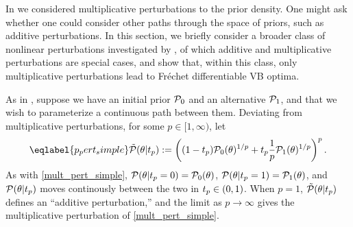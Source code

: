 In  we considered
multiplicative perturbations to the prior density.  One might ask whether one
could consider other paths through the space of priors, such as additive
perturbations.  In this section, we briefly consider a broader class of
nonlinear perturbations investigated by \citet{gustafson:1996:local}, of which
additive and multiplicative perturbations are special cases, and show that,
within this class, only multiplicative perturbations lead to Fr{\'e}chet
differentiable VB optima.

As in , suppose we have an initial prior $\mathcal{P}_{0}$
and an alternative $\mathcal{P}_{1}$, and that we wish to parameterize a continuous path
between them.  Deviating from multiplicative perturbations, for some $p \in [1,
\infty)$, let
%
\begin{align}\eqlabel{p_pert_simple}
%
\ptil(\theta \vert \tp) :=
    \left((1 - \tp)\pbase(\theta)^{1/p} +
    \tp \frac{1}{p}\palt(\theta)^{1/p} \right)^{p}.
%
\end{align}
%
As with \eqref{mult_pert_simple}, $\mathcal{P}(\theta \vert t_{p} = 0) = \mathcal{P}_{0}(\theta)$,
$\mathcal{P}(\theta \vert t_{p} = 1) = \mathcal{P}_{1}(\theta)$, and $\mathcal{P}(\theta \vert t_{p})$ moves
continously between the two in $t_{p} \in (0, 1)$.  When $p = 1$,
$\tilde{\mathcal{P}}(\theta \vert t_{p})$ defines an ``additive perturbation,'' and
the limit as $p \rightarrow \infty$ gives the multiplicative perturbation
of \eqref{mult_pert_simple}.

